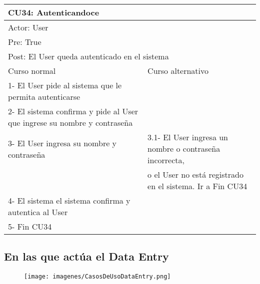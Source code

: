 \begin{table}[H]
  \begin{adjustbox}{max width = \textwidth}
  \begin{tabular}{|l|l|}
    \hline
    \multicolumn{2}{|l|}{CU34: Autenticandoce} \\\hline
    \multicolumn{2}{|l|}{Actor: User} \\\hline
    \multicolumn{2}{|l|}{Pre: True} \\\hline
    \multicolumn{2}{|l|}{Post: El User queda autenticado en el sistema} \\\hline
     Curso normal & Curso alternativo\\ \hline
     1- El User pide al sistema que le permita autenticarse & \\ \hline
     2- El sistema confirma y pide al User que ingrese su nombre y contraseña & \\ \hline
     3- El User ingresa su nombre y contraseña & 3.1- El User ingresa un nombre o contraseña incorrecta, \\ & o el User no está registrado en el sistema. Ir a Fin CU34 \\ \hline
     4- El sistema el sistema confirma y autentica al User & \\ \hline
     5- Fin CU34 & \\ \hline
  \end{tabular}
  \end{adjustbox}
\end{table}

\subsection{En las que actúa el Data Entry}

\begin{figure}[H]
    \texttt{[image: imagenes/CasosDeUsoDataEntry.png]}
\end{figure}

